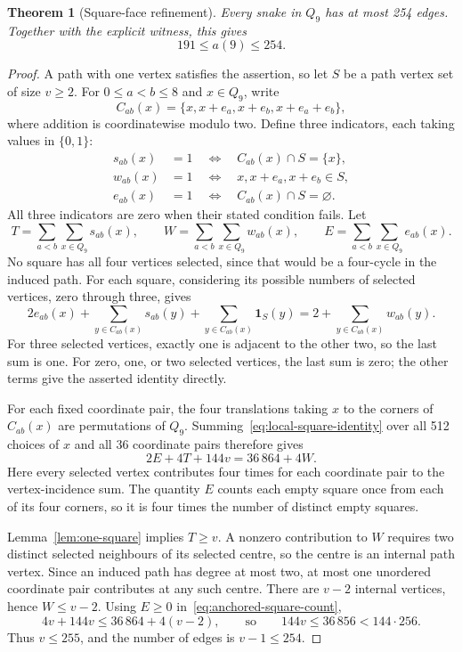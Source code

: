\documentclass[11pt,a4paper]{article}
\newtheorem{theorem}{Theorem}[section]
\theoremstyle{definition}
\theoremstyle{remark}
\newcommand{\Q}{Q}
\begin{document}
\begin{theorem}[Square-face refinement]\label{thm:square-upper}
Every snake in $\Q_9$ has at most 254 edges. Together with the explicit witness, this gives
\[
\boxed{191\le a(9)\le254.}
\]
\end{theorem}
\begin{proof}
A path with one vertex satisfies the assertion, so let $S$ be a path vertex set of size $v\ge2$. For $0\le a<b\le8$ and $x\in\Q_9$, write
\[
C_{ab}(x)=\{x,x+e_a,x+e_b,x+e_a+e_b\},
\]
where addition is coordinatewise modulo two. Define three indicators, each taking values in $\{0,1\}$:
\begin{align*}
s_{ab}(x)&=1\quad\Longleftrightarrow\quad C_{ab}(x)\cap S=\{x\},\\
w_{ab}(x)&=1\quad\Longleftrightarrow\quad x,x+e_a,x+e_b\in S,\\
e_{ab}(x)&=1\quad\Longleftrightarrow\quad C_{ab}(x)\cap S=\varnothing.
\end{align*}
All three indicators are zero when their stated condition fails. Let
\[
T=\sum_{a<b}\sum_{x\in\Q_9}s_{ab}(x),\qquad
W=\sum_{a<b}\sum_{x\in\Q_9}w_{ab}(x),\qquad
E=\sum_{a<b}\sum_{x\in\Q_9}e_{ab}(x).
\]
No square has all four vertices selected, since that would be a four-cycle in the induced path. For each square, considering its possible numbers of selected vertices, zero through three, gives
\begin{equation}\label{eq:local-square-identity}
2e_{ab}(x)+\sum_{y\in C_{ab}(x)}s_{ab}(y)
 +\sum_{y\in C_{ab}(x)}\mathbf{1}_S(y)
=2+\sum_{y\in C_{ab}(x)}w_{ab}(y).
\end{equation}
For three selected vertices, exactly one is adjacent to the other two, so the last sum is one. For zero, one, or two selected vertices, the last sum is zero; the other terms give the asserted identity directly.

For each fixed coordinate pair, the four translations taking $x$ to the corners of $C_{ab}(x)$ are permutations of $\Q_9$. Summing~\eqref{eq:local-square-identity} over all 512 choices of $x$ and all 36 coordinate pairs therefore gives
\begin{equation}\label{eq:anchored-square-count}
2E+4T+144v=36\,864+4W.
\end{equation}
Here every selected vertex contributes four times for each coordinate pair to the vertex-incidence sum. The quantity $E$ counts each empty square once from each of its four corners, so it is four times the number of distinct empty squares.

Lemma~\ref{lem:one-square} implies $T\ge v$. A nonzero contribution to $W$ requires two distinct selected neighbours of its selected centre, so the centre is an internal path vertex. Since an induced path has degree at most two, at most one unordered coordinate pair contributes at any such centre. There are $v-2$ internal vertices, hence $W\le v-2$. Using $E\ge0$ in~\eqref{eq:anchored-square-count},
\[
4v+144v\le36\,864+4(v-2),
\qquad\text{so}\qquad144v\le36\,856<144\cdot256.
\]
Thus $v\le255$, and the number of edges is $v-1\le254$.
\end{proof}
\end{document}
